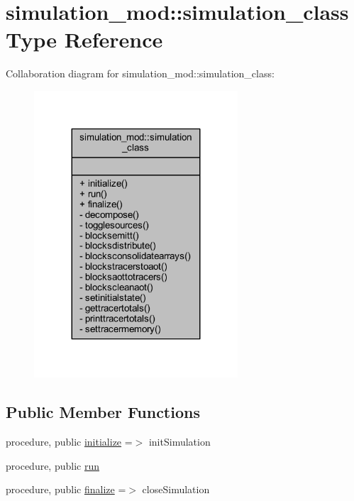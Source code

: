 \hypertarget{structsimulation__mod_1_1simulation__class}{}\section{simulation\+\_\+mod\+:\+:simulation\+\_\+class Type Reference}
\label{structsimulation__mod_1_1simulation__class}


Collaboration diagram for simulation\+\_\+mod\+:\+:simulation\+\_\+class\+:
\nopagebreak
\begin{figure}[H]
\begin{center}
\leavevmode
\includegraphics[width=215pt]{structsimulation__mod_1_1simulation__class__coll__graph}
\end{center}
\end{figure}
\subsection*{Public Member Functions}
\begin{DoxyCompactItemize}
\item 
procedure, public \mbox{\hyperlink{structsimulation__mod_1_1simulation__class_aa66177f314198046f3e05d9a0a322a22}{initialize}} =$>$ init\+Simulation
\item 
procedure, public \mbox{\hyperlink{structsimulation__mod_1_1simulation__class_a47c2f9dd8a012a523ac88aa8d3c6a911}{run}}
\item 
procedure, public \mbox{\hyperlink{structsimulation__mod_1_1simulation__class_a6cc0559141483bce4e4f19ef730735df}{finalize}} =$>$ close\+Simulation
\end{DoxyCompactItemize}
